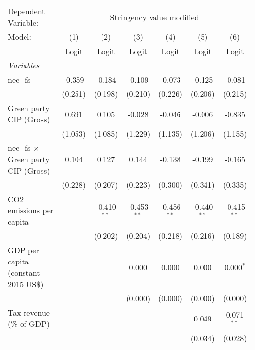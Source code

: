 
\begingroup
\centering
\begin{tabular}{lcccccc}
   \toprule
   Dependent Variable: & \multicolumn{6}{c}{Stringency value modified}\\
   Model:                                     & (1)     & (2)           & (3)           & (4)           & (5)           & (6)\\  
                                              &  Logit  & Logit         & Logit         & Logit         & Logit         & Logit\\  
   \midrule
   \emph{Variables}\\
   nec\_fs                                    & -0.359  & -0.184        & -0.109        & -0.073        & -0.125        & -0.081\\   
                                              & (0.251) & (0.198)       & (0.210)       & (0.226)       & (0.206)       & (0.215)\\   
   Green party CIP (Gross)                    & 0.691   & 0.105         & -0.028        & -0.046        & -0.006        & -0.835\\   
                                              & (1.053) & (1.085)       & (1.229)       & (1.135)       & (1.206)       & (1.155)\\   
   nec\_fs $\times$ Green party CIP (Gross)   & 0.104   & 0.127         & 0.144         & -0.138        & -0.199        & -0.165\\   
                                              & (0.228) & (0.207)       & (0.223)       & (0.300)       & (0.341)       & (0.335)\\   
   CO2 emissions per capita                   &         & -0.410$^{**}$ & -0.453$^{**}$ & -0.456$^{**}$ & -0.440$^{**}$ & -0.415$^{**}$\\   
                                              &         & (0.202)       & (0.204)       & (0.218)       & (0.216)       & (0.189)\\   
   GDP per capita (constant 2015 US\$)        &         &               & 0.000         & 0.000         & 0.000         & 0.000$^{*}$\\   
                                              &         &               & (0.000)       & (0.000)       & (0.000)       & (0.000)\\   
   Tax revenue (\% of GDP)                    &         &               &               &               & 0.049         & 0.071$^{**}$\\   
                                              &         &               &               &               & (0.034)       & (0.028)\\   

\end{tabular}
